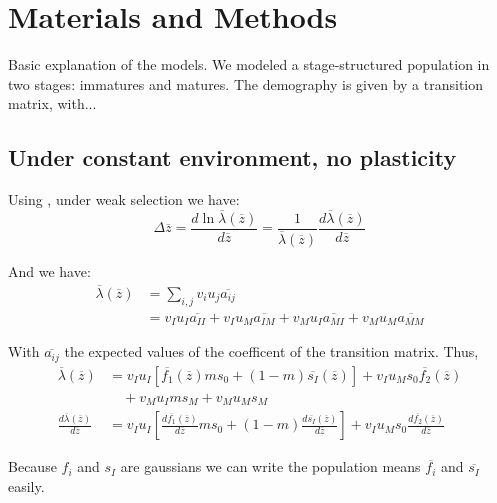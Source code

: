 \section*{Materials and Methods}

Basic explanation of the models. We modeled a stage-structured population in two stages: immatures and matures. The demography is given by a transition matrix, with...

\subsection*{Under constant environment, no plasticity}

Using \citet{lande_adaptation_2009}, under weak selection we have:
\begin{equation}
	\label{eq:dz}
	\Delta\overline{z} = \frac{d\ln\overline{\lambda}(\overline{z})}{d\overline{z}} = \frac{1}{\overline{\lambda}(\overline{z})} \frac{d\overline{\lambda}(\overline{z})}{d\overline{z}}
\end{equation}

And we have:
\begin{align*}
	\overline{\lambda}(\overline{z}) &= \sum_{i,j}{v_{i} u_{j} \overline{a_{ij}}} \\
	&= v_{I} u_{I} \overline{a_{II}} + v_{I} u_{M} \overline{a_{IM}} + v_{M} u_{I} \overline{a_{MI}} + v_{M} u_{M} \overline{a_{MM}}
\end{align*}

With $\overline{a_{ij}}$ the expected values of the coefficent of the transition matrix. Thus,
\begin{align}
	\overline{\lambda}(\overline{z}) &= v_{I} u_{I} \left[ \overline{f_{1}}(\overline{z}) m s_{0} + (1-m) \overline{s_{I}}(\overline{z}) \right] + v_{I} u_{M} s_{0} \overline{f_{2}}(\overline{z}) \nonumber \\
	&\quad + v_{M} u_{I} m s_{M} + v_{M} u_{M} s_M \\
	\label{eq:dlambda}
	\frac{d\overline{\lambda}(\overline{z})}{d\overline{z}} &= v_{I} u_{I} \left[ \frac{d\overline{f_{1}}(\overline{z})}{d\overline{z}} m s_{0} + (1-m) \frac{d\overline{s_{I}}(\overline{z})}{d\overline{z}} \right] + v_{I} u_{M} s_{0} \frac{d\overline{f_{2}}(\overline{z})}{d\overline{z}}
\end{align}

Because $f_{i}$ and $s_{I}$ are gaussians we can write the population means $\overline{f_{i}}$ and $\overline{s_{I}}$ easily.

